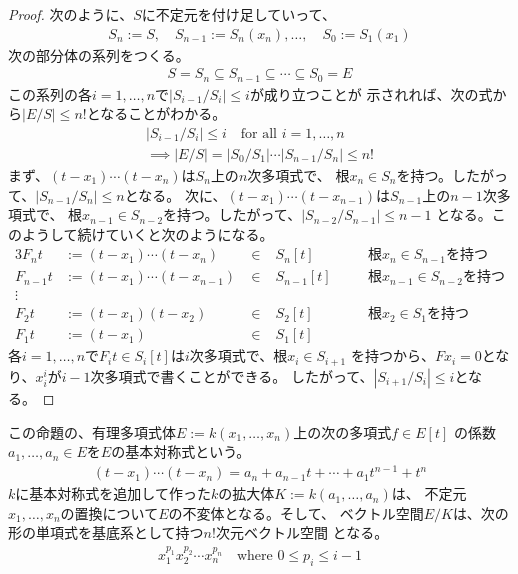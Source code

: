 {\begin{proof}
		次のように、$S$に不定元を付け足していって、
		\begin{equation*}\begin{split}
			S_n:=S,\quad S_{n-1}:=S_n(x_n),\dots,\quad S_0:=S_1(x_1)
		\end{split}\end{equation*}
		次の部分体の系列をつくる。
		\begin{equation*}\begin{split}
			S=S_n\subseteq S_{n-1}\subseteq\cdots\subseteq S_0=E
		\end{split}\end{equation*}
		この系列の各$i=1,\dots,n$で$|S_{i-1}/S_i|\le i$が成り立つことが
		示されれば、次の式から$|E/S|\le n!$となることがわかる。
		\begin{equation*}\begin{split}
			|S_{i-1}/S_i|\le i \quad\text{for all } i=1,\dots,n \\
			\implies |E/S|=|S_0/S_1|\cdots|S_{n-1}/S_n|\le n!
		\end{split}\end{equation*}
		まず、$(t-x_1)\cdots(t-x_n)$は$S_n$上の$n$次多項式で、
		根$x_n\in S_n$を持つ。したがって、$|S_{n-1}/S_n|\le n$となる。
		次に、$(t-x_1)\cdots(t-x_{n-1})$は$S_{n-1}$上の$n-1$次多項式で、
		根$x_{n-1}\in S_{n-2}$を持つ。したがって、$|S_{n-2}/S_{n-1}|\le n-1$
		となる。このようして続けていくと次のようになる。
		\begin{alignat*}{3}
			F_nt &:= (t-x_1)\cdots(t-x_n) &\;\in\;& S_n[t] 
				&\quad& \text{根$x_n\in S_{n-1}$を持つ} \\
			F_{n-1}t &:= (t-x_1)\cdots(t-x_{n-1}) &\;\in\;& S_{n-1}[t]
				&\quad& \text{根$x_{n-1}\in S_{n-2}$を持つ} \\
			\vdots \\
			F_2t &:= (t-x_1)(t-x_2) &\;\in\;& S_2[t]
				&\quad& \text{根$x_2\in S_1$を持つ} \\
			F_1t &:= (t-x_1) &\;\in\;& S_1[t]
		\end{alignat*}
		各$i=1,\dots,n$で$F_it\in S_i[t]$は$i$次多項式で、根$x_i\in S_{i+1}$
		を持つから、$Fx_i=0$となり、$x_i^i$が$i-1$次多項式で書くことができる。
		したがって、$|S_{i+1}/S_i|\le i$となる。
	\end{proof} %

	この命題の、有理多項式体$E:=k(x_1,\dots,x_n)$上の次の多項式$f\in E[t]$
	の係数$a_1,\dots,a_n\in E$を$E$の基本対称式という。
	\begin{equation*}\begin{split}
		(t-x_1)\cdots(t-x_n) = a_n + a_{n-1}t +\cdots+ a_1t^{n-1} + t^n
	\end{split}\end{equation*}
	$k$に基本対称式を追加して作った$k$の拡大体$K:=k(a_1,\dots,a_n)$は、
	不定元$x_1,\dots,x_n$の置換について$E$の不変体となる。そして、
	ベクトル空間$E/K$は、次の形の単項式を基底系として持つ$n!$次元ベクトル空間
	となる。
	\begin{equation*}\begin{split}
		x_1^{p_1}x_2^{p_2}\cdots x_n^{p_n}
		\quad\text{where } 0\le p_i\le i-1
	\end{split}\end{equation*}
}
